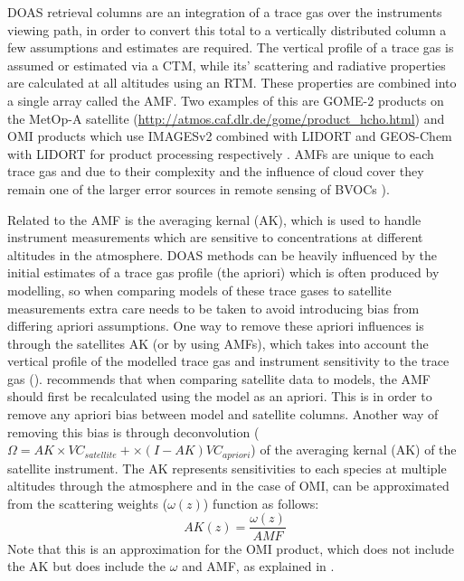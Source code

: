       DOAS retrieval columns are an integration of a trace gas over the instruments viewing path, in order to convert this total to a vertically distributed column a few assumptions and estimates are required. 
      The vertical profile of a trace gas is assumed or estimated via a CTM, while its' scattering and radiative properties are calculated at all altitudes using an RTM. 
      These properties are combined into a single array called the AMF.
      Two examples of this are GOME-2 products on the MetOp-A satellite (\url{http://atmos.caf.dlr.de/gome/product_hcho.html}) and OMI products which use IMAGESv2 combined with LIDORT and GEOS-Chem with LIDORT for product processing respectively \parencite{Chance2002, Abad2015}.
      AMFs are unique to each trace gas and due to their complexity and the influence of cloud cover they remain one of the larger error sources in remote sensing of BVOCs \parencite{Palmer2001,Millet2006}).
      
      Related to the AMF is the averaging kernal (AK), which is used to handle instrument measurements which are sensitive to concentrations at different altitudes in the atmosphere.
      DOAS methods can be heavily influenced by the initial estimates of a trace gas profile (the apriori) which is often produced by modelling, so when comparing models of these trace gases to satellite measurements extra care needs to be taken to avoid introducing bias from differing apriori assumptions.
      One way to remove these apriori influences is through the satellites AK (or by using AMFs), which takes into account the vertical profile of the modelled trace gas and instrument sensitivity to the trace gas (\textcite{Eskes2003, Palmer2001}).
      \textcite{Lamsal2014} recommends that when comparing satellite data to models, the AMF should first be recalculated using the model as an apriori.
      This is in order to remove any apriori bias between model and satellite columns.
      Another way of removing this bias is through deconvolution ($\Omega = AK \times VC_{satellite} + \times (I - AK) VC_{apriori}$) of the averaging kernal (AK) of the satellite instrument.
      The AK represents sensitivities to each species at multiple altitudes through the atmosphere and in the case of OMI, can be approximated from the scattering weights ($\omega(z)$) function as follows:
      \begin{equation} \label{ch_HCHO:eqn:AKfromw}
      AK(z) = \frac{\omega(z)}{AMF}
      \end{equation}
      Note that this is an approximation for the OMI product, which does not include the AK but does include the $\omega$ and AMF, as explained in \textcite{Abad2015}.
      

